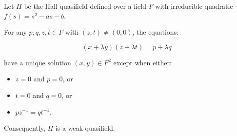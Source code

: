 Let $H$ be the Hall quasifield defined over a field $F$ with irreducible quadratic $f(s) = s^2 - as - b$.

For any $p, q, z, t \in F$ with $(z, t) \neq (0, 0)$, the equations:

$$(x + \lambda y)(z + \lambda t) = p + \lambda q$$

have a unique solution $(x, y) \in F^2$ except when either:
\begin{itemize}
\item $z = 0$ and $p = 0$, or
\item $t = 0$ and $q = 0$, or
\item $pz^{-1} = qt^{-1}$.
\end{itemize}

Consequently, $H$ is a weak quasifield.

